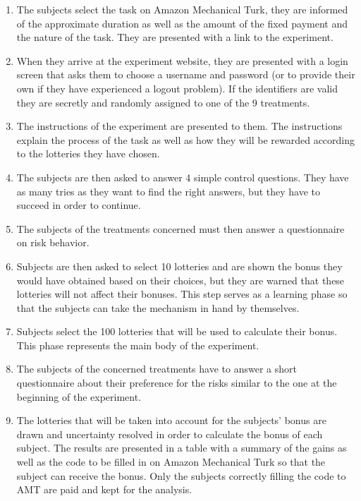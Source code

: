 \documentclass[
]{book}
\providecommand{\tightlist}{%
  \setlength{\itemsep}{0pt}\setlength{\parskip}{0pt}}
\begin{document}
\begin{enumerate}
\def\labelenumi{\arabic{enumi}.}
\tightlist
\item
  The subjects select the task on Amazon Mechanical Turk, they are
  informed of the approximate duration as well as the amount of the
  fixed payment and the nature of the task. They are presented with a
  link to the experiment.
\item
  When they arrive at the experiment website, they are presented with a login
  screen that asks them to choose a username and password (or to
  provide their own if they have experienced a logout problem). If the
  identifiers are valid they are secretly and randomly assigned to one of the 9
  treatments.
\item
  The instructions of the experiment are presented to them. The instructions
  explain the process of the task as well as how they will be rewarded
  according to the lotteries they have chosen.
\item
  The subjects are then asked to answer 4 simple control questions.
  They have as many tries as they want to find the right answers, but
  they have to succeed in order to continue.
\item
  The subjects of the treatments concerned must then answer a
  questionnaire on risk behavior.
\item
  Subjects are then asked to select 10 lotteries and are shown the
  bonus they would have obtained based on their choices, but they are
  warned that these lotteries will not affect their bonuses. This step
  serves as a learning phase so that the subjects can take the
  mechanism in hand by themselves.
\item
  Subjects select the 100 lotteries that will be used to calculate
  their bonus. This phase represents the main body of the experiment.
\item
  The subjects of the concerned treatments have to answer a short
  questionnaire about their preference for the risks similar to the
  one at the beginning of the experiment.
\item
  The lotteries that will be taken into account for the subjects'
  bonus are drawn and uncertainty resolved in order to calculate the bonus of each subject.
  The results are presented in a table with a summary of the gains as
  well as the code to be filled in on Amazon Mechanical Turk so that
  the subject can receive the bonus. Only the subjects correctly filling the code to AMT are paid and kept for the analysis.
\end{enumerate}
\end{document}
